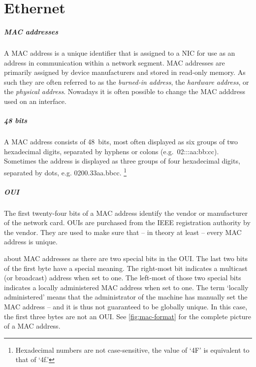\chapter{Ethernet}
\label{chap:ethernet}

\paragraph{\acs{MAC} addresses}
A \ac{MAC} address is a unique identifier that is assigned to a \ac{NIC} for use as an address in communication within a network segment.
\ac{MAC} addresses are primarily assigned by device manufacturers and stored in read-only memory.
As such they are often referred to as the \emph{burned-in address}, the \emph{hardware address}, or the \emph{physical address}.
Nowadays it is often possible to change the \acs{MAC} adddress used on an interface.

\paragraph{48 bits}
A \ac{MAC} address consists of 48~bits, most often displayed as six groups of two hexadecimal digits, separated by hyphens or colons (e.g.~02:::\-aa:\-bb:\-cc).
Sometimes the address is displayed as three groups of four hexadecimal digits, separated by dots, e.g. 0200.33aa.bbcc.%
   \footnote{Hexadecimal numbers are not case-sensitive, the value of `4F' is equivalent to that of `4f.'}

\paragraph{\acf{OUI}}
The first twenty-four bits of a \ac{MAC} address identify the vendor or manufacturer of the network card.
\Acp{OUI} are purchased from the \acs{IEEE} registration authority by the vendor.
They are used to make sure that -- in theory at least -- every \acs{MAC} address is unique.

 about \acs{MAC} addresses as there are two special bits in the \acs{OUI}.
The last two bits of the first byte have a special meaning.
The right-most bit indicates a multicast (or broadcast) address when set to one.
The left-most of those two special bits indicates a locally administered \acs{MAC} address when set to one.
The term `locally administered' means that the administrator of the machine has manually set the \acs{MAC} address -- and it is thus not guaranteed to be globally unique.
In this case, the first three bytes are not an \acl{OUI}.
See \cref{fig:mac-format} for the complete picture of a \acs{MAC} address.


